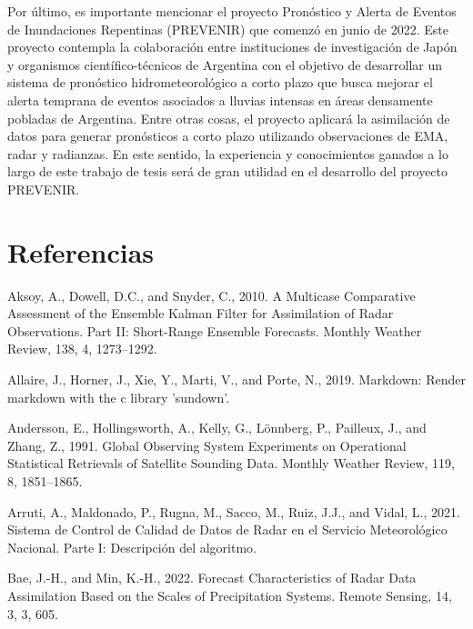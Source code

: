 \documentclass[12pt,oneside,a4paper]{reedthesis}
\begin{document}
Por último, es importante mencionar el proyecto Pronóstico y Alerta de Eventos de Inundaciones Repentinas (PREVENIR) que comenzó en junio de 2022. Este proyecto contempla la colaboración entre instituciones de investigación de Japón y organismos científico-técnicos de
Argentina con el objetivo de desarrollar un sistema de pronóstico hidrometeorológico a corto plazo que busca mejorar el alerta temprana de eventos asociados a lluvias intensas en áreas densamente pobladas de Argentina. Entre otras cosas, el proyecto aplicará la asimilación de datos para generar pronósticos a corto plazo utilizando observaciones de EMA, radar y radianzas. En este sentido, la experiencia y conocimientos ganados a lo largo de este trabajo de tesis será de gran utilidad en el desarrollo del proyecto PREVENIR.

\backmatter

\hypertarget{referencias}{%
\chapter*{Referencias}\label{referencias}}


\noindent

\setlength{\parindent}{-0.20in}

\hypertarget{refs}{}
\leavevmode\hypertarget{ref-aksoy2010}{}%
Aksoy, A., Dowell, D.C., and Snyder, C., 2010. A Multicase Comparative Assessment of the Ensemble Kalman Filter for Assimilation of Radar Observations. Part II: Short-Range Ensemble Forecasts. Monthly Weather Review, 138, 4, 1273--1292.

\leavevmode\hypertarget{ref-allaire2019}{}%
Allaire, J., Horner, J., Xie, Y., Marti, V., and Porte, N., 2019. Markdown: Render markdown with the c library 'sundown'.

\leavevmode\hypertarget{ref-andersson1991}{}%
Andersson, E., Hollingsworth, A., Kelly, G., Lönnberg, P., Pailleux, J., and Zhang, Z., 1991. Global Observing System Experiments on Operational Statistical Retrievals of Satellite Sounding Data. Monthly Weather Review, 119, 8, 1851--1865.

\leavevmode\hypertarget{ref-arruti2021}{}%
Arruti, A., Maldonado, P., Rugna, M., Sacco, M., Ruiz, J.J., and Vidal, L., 2021. Sistema de Control de Calidad de Datos de Radar en el Servicio Meteorológico Nacional. Parte I: Descripción del algoritmo.

\leavevmode\hypertarget{ref-bae2022}{}%
Bae, J.-H., and Min, K.-H., 2022. Forecast Characteristics of Radar Data Assimilation Based on the Scales of Precipitation Systems. Remote Sensing, 14, 3, 3, 605.
\end{document}
